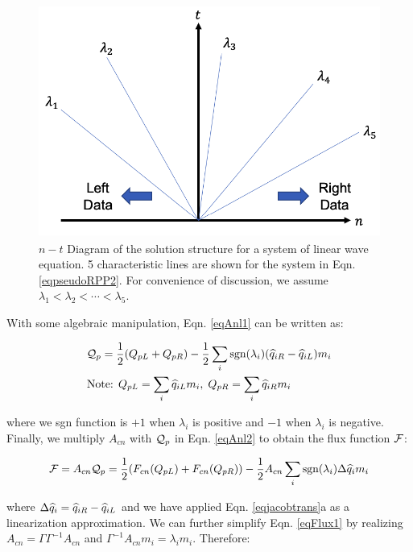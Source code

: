 \documentclass[12pt, letterpaper]{report}
\begin{document}
\begin{figure}[H]
   \centering
   \includegraphics[height=3in]{Algorithm5.png}
   \caption{$n-t$ Diagram of the solution structure for a system of linear wave equation. 5
      characteristic lines are shown for the system in Eqn. \ref{eqpseudoRPP2}. For
   convenience of discussion, we assume $\lambda_1 < \lambda_2 < \cdots < \lambda_5$.}
   \label{figNTDiag}
\end{figure}

With some algebraic manipulation, Eqn. \ref{eqAnl1} can be written as:

\begin{align}\label{eqAnl2}
   \begin{split}
      &\mathcal{Q}_p = \frac{1}{2}(Q_{pL} + Q_{pR}) - \frac{1}{2} \sum_i \textrm{sgn}(\lambda_i) (\widehat{q}_{iR}
      - \widehat{q}_{iL}) m_i \\
      &\textrm{Note:  } Q_{pL} = \sum_i \widehat{q}_{iL} m_i, \; Q_{pR} = \sum_i \widehat{q}_{iR} m_i
   \end{split}
\end{align}

where we sgn function is $+1$ when $\lambda_i$ is positive and $-1$ when $\lambda_i$ is
negative. Finally, we multiply $A_{cn}$ with $\mathcal{Q}_p$ in Eqn. \ref{eqAnl2} to obtain the flux
function $\mathcal{F}$:

\begin{align}\label{eqFlux1}
   \mathcal{F} = A_{cn} \mathcal{Q}_p = \frac{1}{2}(F_{cn}(Q_{pL}) + F_{cn}(Q_{pR})) - \frac{1}{2}A_{cn} \sum_i
   \textrm{sgn}(\lambda_i) \Delta \widehat{q}_i m_i
\end{align}

where $\Delta \widehat{q}_i = \widehat{q}_{iR} - \widehat{q}_{iL}$ and we have applied Eqn. \ref{eqjacobtrans}a as a
linearization approximation. We can further simplify Eqn. \ref{eqFlux1} by realizing $A_{cn} =
\Gamma \Gamma^{-1} A_{cn}$ and $\Gamma^{-1} A_{cn} m_i = \lambda_i m_i$. Therefore:
\end{document}
